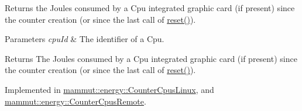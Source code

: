 Returns the Joules consumed by a Cpu integrated graphic card (if present) since the counter creation (or since the last call of \hyperlink{classmammut_1_1energy_1_1CounterCpus_ac3d2b3c06119c5e4f077b05689b2374a}{reset()}). 
\begin{DoxyParams}{Parameters}
{\em cpu\-Id} & The identifier of a Cpu. \\
\hline
\end{DoxyParams}
\begin{DoxyReturn}{Returns}
The Joules consumed by a Cpu integrated graphic card (if present) since the counter creation (or since the last call of \hyperlink{classmammut_1_1energy_1_1CounterCpus_ac3d2b3c06119c5e4f077b05689b2374a}{reset()}). 
\end{DoxyReturn}


Implemented in \hyperlink{classmammut_1_1energy_1_1CounterCpusLinux_ad8dc0f2a9618e6d013b45090a7060042}{mammut\-::energy\-::\-Counter\-Cpus\-Linux}, and \hyperlink{classmammut_1_1energy_1_1CounterCpusRemote_af886a7df65acafc4bb762fb45a91bfaa}{mammut\-::energy\-::\-Counter\-Cpus\-Remote}.

